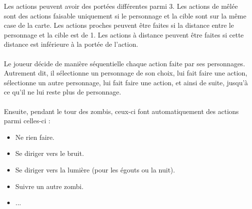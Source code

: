 Les actions peuvent avoir des portées différentes parmi 3. Les actions de mêlée sont des actions faisable uniquement si le personnage et la cible sont sur la même case de la carte. Les actions proches peuvent être faites si la distance entre le personnage et la cible est de 1. Les actions à distance peuvent être faites si cette distance est inférieure à la portée de l'action.
\\\\
Le joueur décide de manière séquentielle chaque action faite par ses personnages. Autrement dit, il sélectionne un personnage de son choix, lui fait faire une action, sélectionne un autre personnage, lui fait faire une action, et ainsi de suite, jusqu'à ce qu'il ne lui reste plus de personnage.
\\\\
Ensuite, pendant le tour des zombis, ceux-ci font automatiquement des actions parmi celles-ci :
\begin{itemize}
  \item Ne rien faire.
  \item Se diriger vers le bruit.
  \item Se diriger vers la lumière (pour les égouts ou la nuit).
  \item Suivre un autre zombi.
  \item ...
\end{itemize}